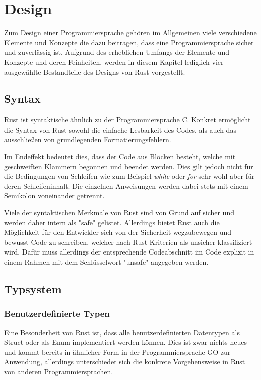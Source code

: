 \newenvironment{code}{\captionsetup{type=listing}}{}
\chapter{Design}
Zum Design einer Programmiersprache gehören im Allgemeinen viele verschiedene Elemente und Konzepte die dazu beitragen, dass eine Programmiersprache sicher und zuverlässig ist. Aufgrund des erheblichen Umfangs der Elemente und Konzepte und deren Feinheiten, werden in diesem Kapitel lediglich vier ausgewählte Bestandteile des Designs von Rust vorgestellt.

\section{Syntax}
Rust ist syntaktische ähnlich zu der Programmiersprache C. Konkret ermöglicht die Syntax von Rust sowohl die einfache Lesbarkeit des Codes, als auch das ausschließen von grundlegenden Formatierungsfehlern. \autocite{rust-the-book}

Im Endeffekt bedeutet dies, dass der Code aus Blöcken besteht, welche mit geschweiften Klammern begonnen und beendet werden. Dies gilt jedoch nicht für die Bedingungen von Schleifen wie zum Beispiel \textit{while} oder \textit{for} sehr wohl aber für deren Schleifeninhalt. Die einzelnen Anweisungen werden dabei stets mit einem Semikolon voneinander getrennt.  \autocite{rust-the-book}\autocite{rust-by-example}\autocite{rust-wiki}

Viele der syntaktischen Merkmale von Rust sind von Grund auf sicher und werden daher intern als "safe" gelistet. Allerdings bietet Rust auch die Möglichkeit für den Entwickler sich von der Sicherheit wegzubewegen und bewusst Code zu schreiben, welcher nach Rust-Kriterien als unsicher klassifiziert wird. Dafür muss allerdings der entsprechende Codeabschnitt im Code explizit in einem Rahmen mit dem Schlüsselwort "unsafe" angegeben werden.\autocite{rust-the-book}\autocite{rust-by-example}\autocite{rust-wiki}

\section{Typsystem}
\subsection{Benutzerdefinierte Typen}
Eine Besonderheit von Rust ist, dass alle benutzerdefinierten Datentypen als Struct oder als Enum implementiert werden können. Dies ist zwar nichts neues und kommt bereits in ähnlicher Form in der Programmiersprache GO zur Anwendung, allerdings unterschiedet sich die konkrete Vorgehensweise in Rust von anderen Programmiersprachen.

